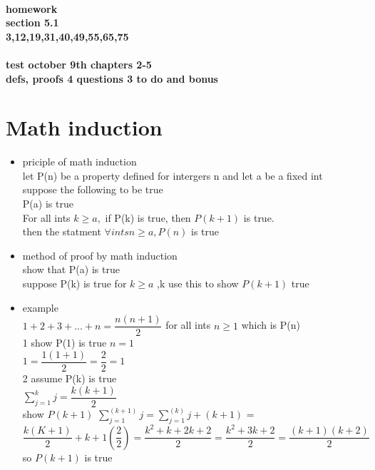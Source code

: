 \documentclass[10pt,letterpaper]{report}
\begin{document}
\paragraph{homework \\section 5.1\\ 3,12,19,31,40,49,55,65,75}
\paragraph{test october 9th chapters 2-5 \\ defs, proofs 4 questions 3 to do and bonus }
\section{Math induction}
\begin{itemize}
\item priciple of math induction \\ let P(n) be a property defined for intergers n and let a be a fixed int  \\ suppose the following to be true \\ P(a) is true \\ For all ints $k \geq a, $ if P(k) is true, then $P(k+1)$ is true. \\ then the statment $\forall ints n \geq a, P(n)$ is true
\item method of proof by math induction \\ show that P(a) is true \\ suppose P(k) is true for $ k \geq a$ ,k use this to show $ P (k+1)$ true 
\item example \\ $ 1+2+3+...+n = \dfrac{n(n+1)}{2}$ for all ints $n \geq 1$ which is P(n) \\ 1 show P(1) is true $n=1$ \\ $1 = \dfrac{1(1+1)}{2}= \dfrac{2}{2} = 1$ \\ 2 assume P(k) is true \\ $ \sum\limits_{j=1}^k j = \dfrac{k(k+1)}{2}$ \\ show $P(k+1)$  $ \sum\limits_{j=1}^(k+1) j = \sum\limits_{j=1}^(k) j + (k+1)$ = $ \dfrac{k(K+1)}{2}+k+1(\dfrac{2}{2}) = \dfrac{k^2 + k + 2k + 2}{2} = \dfrac{k^2 + 3k+2}{2}  = \dfrac{(k+1)(k+2)}{2} $ so $P(k+1)$ is true

\end{itemize}
\end{document}

